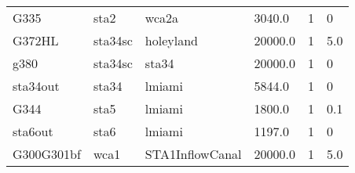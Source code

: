 \begin{table}[!htb]
\begin{center}
\begin{tabular}{p{2.8cm}p{2.5cm}p{2.5cm}p{1.8cm}p{1.5cm}p{1.5cm}}
  G335             &sta2            &wca2a            & 3040.0        &1       &0   \\
  G372HL           &sta34sc         &holeyland        &20000.0        &1       &5.0 \\
  g380             &sta34sc         &sta34            &20000.0        &1       &0   \\
  sta34out         &sta34           &lmiami           & 5844.0        &1       &0   \\
  G344             &sta5            &lmiami           & 1800.0        &1       &0.1 \\
  sta6out          &sta6            &lmiami           & 1197.0        &1       &0   \\
  G300G301bf       &wca1            &STA1InflowCanal  &20000.0        &1       &5.0 \\     
  \hline                                                                            
  \end{tabular}
 \end{center}
\end{table}
\normalsize

